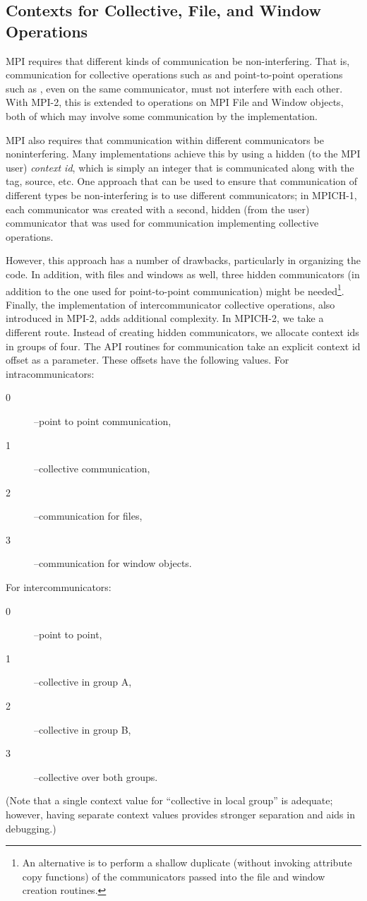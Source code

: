 \subsection{Contexts for Collective, File, and Window Operations}
\label{sec:comm-for-coll}
MPI requires that different kinds of communication be
non-interfering.  That is, communication for collective operations
such as  and point-to-point operations such as
, even on the same communicator, must not interfere
with each other.  With MPI-2, this is extended to operations on MPI
File and Window objects, both of which may involve some communication
by the implementation.

MPI also requires that communication within different
communicators be noninterfering.  Many implementations achieve this by
using a hidden (to the MPI user) \emph{context id},
which is simply an 
integer that is communicated along with the tag, source, etc.  
One approach that can be used to ensure that
communication of different types be non-interfering is to use
different communicators; in MPICH-1, each communicator was created
with a second, hidden (from the user) communicator that was used for
communication implementing collective operations.  

However, this approach has a number of drawbacks, particularly in
organizing the code.  In addition, with files and windows as well,
three hidden communicators (in addition to the one used for point-to-point
communication) might be needed\footnote{An alternative is
to perform a shallow duplicate (without invoking attribute copy
functions) of the communicators passed into the file and window
creation routines.}.  Finally, the implementation of intercommunicator
collective operations, also introduced in MPI-2, adds additional
complexity.  In MPICH-2, we take a different route.  Instead of
creating hidden communicators, we allocate context ids in groups of
four.  The API routines for communication take an explicit context id
offset as a parameter.  These offsets have the following values.  For
intracommunicators: 
\begin{description}
\item[0]--point to point communication, 
\item[1]--collective communication, 
\item[2]--communication for files, 
\item[3]--communication for window objects.  
\end{description}
For intercommunicators: 
\begin{description}
\item[0]--point to point, 
\item[1]--collective in group A, 
\item[2]--collective in group B, 
\item[3]--collective over both groups.
\end{description}
(Note that a single context value for ``collective in local group'' is
adequate; however, having separate context values provides stronger
separation and aids in debugging.)
%

